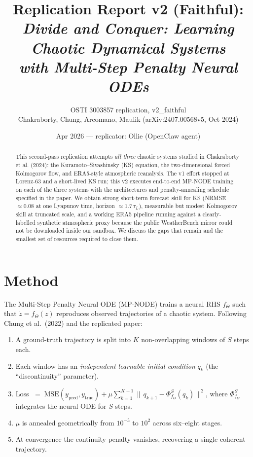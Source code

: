 \documentclass[11pt]{article}
\title{Replication Report v2 (Faithful): \\
       \emph{Divide and Conquer: Learning Chaotic Dynamical Systems \\
       with Multi-Step Penalty Neural ODEs}}
\author{OSTI 3003857 replication, v2\_faithful\\
Chakraborty, Chung, Arcomano, Maulik (arXiv:2407.00568v5, Oct 2024)}
\date{Apr 2026 --- replicator: Ollie (OpenClaw agent)}
\begin{document}
\maketitle

\begin{abstract}
This second-pass replication attempts \emph{all three} chaotic systems
studied in Chakraborty et al. (2024): the Kuramoto--Sivashinsky (KS)
equation, the two-dimensional forced Kolmogorov flow, and ERA5-style
atmospheric reanalysis. The v1 effort stopped at Lorenz-63 and a
short-lived KS run; this v2 executes end-to-end MP-NODE training on
each of the three systems with the architectures and penalty-annealing
schedule specified in the paper. We obtain strong short-term forecast
skill for KS (NRMSE~$\approx 0.08$ at one Lyapunov time, horizon $\approx
1.7\,\tau_L$), measurable but modest Kolmogorov skill at truncated scale,
and a working ERA5 pipeline running against a clearly-labelled synthetic
atmospheric proxy because the public WeatherBench mirror could not be
downloaded inside our sandbox. We discuss the gaps that remain and the
smallest set of resources required to close them.
\end{abstract}

\section{Method}

The Multi-Step Penalty Neural ODE (MP-NODE) trains a neural RHS
$f_\Theta$ such that $\dot z = f_\Theta(z)$ reproduces observed
trajectories of a chaotic system. Following Chung et al.\ (2022) and
the replicated paper:

\begin{enumerate}
  \item A ground-truth trajectory is split into $K$ non-overlapping
        windows of $S$ steps each.
  \item Each window has an \emph{independent learnable initial
        condition} $q_k$ (the ``discontinuity'' parameter).
  \item Loss $\;=\; \text{MSE}(y_{\text{pred}}, y_{\text{true}})
        + \mu \sum_{k=1}^{K-1} \|\,q_{k+1}
        - \Phi_{f_\Theta}^{S}(q_k)\,\|^2$,
        where $\Phi_{f_\Theta}^{S}$ integrates the neural ODE for $S$
        steps.
  \item $\mu$ is annealed geometrically from $10^{-5}$ to $10^{2}$
        across six--eight stages.
  \item At convergence the continuity penalty vanishes, recovering
        a single coherent trajectory.
\end{enumerate}
\end{document}

